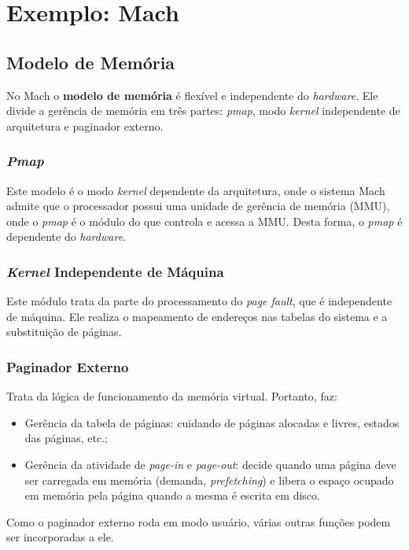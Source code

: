 \section{Exemplo: Mach}

\subsection{Modelo de Memória}
No Mach o \textbf{modelo de memória} é flexível e independente do \textit{hardware}. Ele divide a gerência de memória em três partes: \textit{pmap}, modo \textit{kernel} independente de arquitetura e paginador externo.

\subsubsection{\textit{Pmap}}
Este modelo é o modo \textit{kernel} dependente da arquitetura, onde o sistema Mach admite que o processador possui uma unidade de gerência de memória (MMU), onde o \textit{pmap} é o módulo do que controla e acessa a MMU. Desta forma, o \textit{pmap} é dependente do \textit{hardware}.

\subsubsection{\textit{Kernel} Independente de Máquina}
Este módulo trata da parte do processamento do \textit{page fault}, que é independente de máquina. Ele realiza o mapeamento de endereços nas tabelas do sistema e a substituição de páginas.

\subsubsection{Paginador Externo}
Trata da lógica de funcionamento da memória virtual. Portanto, faz:
\begin{itemize}
  \item Gerência da tabela de páginas: cuidando de páginas alocadas e livres, estados das páginas, etc.;

  \item Gerência da atividade de \textit{page-in} e \textit{page-out}: decide quando uma página deve ser carregada em memória (demanda, \textit{prefetching}) e libera o espaço ocupado em memória pela página quando a mesma é escrita em disco.
\end{itemize}

Como o paginador externo roda em modo usuário, várias outras funções podem ser incorporadas a ele.


